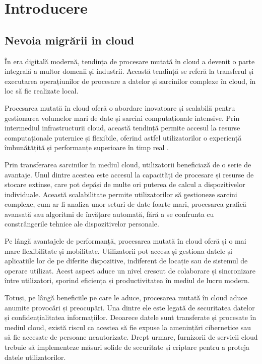\chapter{Introducere}

\section{Nevoia migrării in cloud}

În era digitală modernă, tendința de procesare mutată în cloud a devenit o parte integrală a multor domenii și industrii. Această tendință se referă la transferul și executarea operațiunilor de procesare a datelor și sarcinilor complexe în cloud, în loc să fie realizate local.

Procesarea mutată în cloud oferă o abordare inovatoare și scalabilă pentru gestionarea volumelor mari de date și sarcini computaționale intensive. Prin intermediul infrastructurii cloud, această tendință permite accesul la resurse computaționale puternice și flexibile, oferind astfel utilizatorilor o experiență îmbunătățită și performanțe superioare în timp real \cite{benefits-of-cloud-computing}.

Prin transferarea sarcinilor în mediul cloud, utilizatorii beneficiază de o serie de avantaje. Unul dintre acestea este accesul la capacități de procesare și resurse de stocare extinse, care pot depăși de multe ori puterea de calcul a dispozitivelor individuale. Această scalabilitate permite utilizatorilor să gestioneze sarcini complexe, cum ar fi analiza unor seturi de date foarte mari, procesarea grafică avansată sau algoritmi de învățare automată, fără a se confrunta cu constrângerile tehnice ale dispozitivelor personale.

Pe lângă avantajele de performanță, procesarea mutată în cloud oferă și o mai mare flexibilitate și mobilitate. Utilizatorii pot accesa și gestiona datele și aplicațiile lor de pe diferite dispozitive, indiferent de locație sau de sistemul de operare utilizat. Acest aspect aduce un nivel crescut de colaborare și sincronizare între utilizatori, sporind eficiența și productivitatea în mediul de lucru modern.

Totuși, pe lângă beneficiile pe care le aduce, procesarea mutată în cloud aduce anumite provocări și preocupări. Una dintre ele este legată de securitatea datelor și confidențialitatea informațiilor. Deoarece datele sunt transferate și procesate în mediul cloud, există riscul ca acestea să fie expuse la amenințări cibernetice sau să fie accesate de persoane neautorizate. Drept urmare, furnizorii de servicii cloud trebuie să implementeze măsuri solide de securitate și criptare pentru a proteja datele utilizatorilor.

